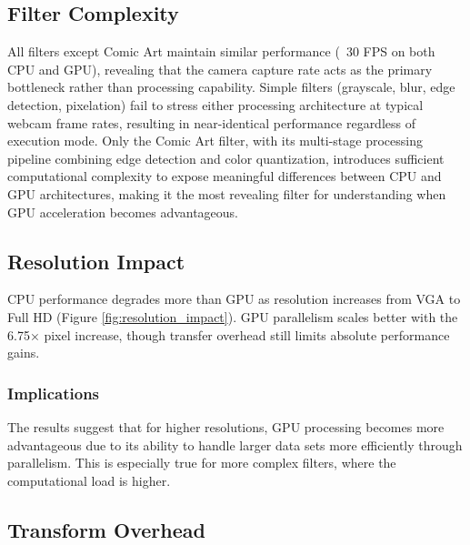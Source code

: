 \documentclass[12pt,a4paper]{article}
\begin{document}
\subsection{Filter Complexity}
All filters except Comic Art maintain similar performance (~30 FPS on both CPU and GPU), revealing that the camera capture rate acts as the primary bottleneck rather than processing capability. Simple filters (grayscale, blur, edge detection, pixelation) fail to stress either processing architecture at typical webcam frame rates, resulting in near-identical performance regardless of execution mode. Only the Comic Art filter, with its multi-stage processing pipeline combining edge detection and color quantization, introduces sufficient computational complexity to expose meaningful differences between CPU and GPU architectures, making it the most revealing filter for understanding when GPU acceleration becomes advantageous.

\subsection{Resolution Impact}
CPU performance degrades more than GPU as resolution increases from VGA to Full HD (Figure \ref{fig:resolution_impact}). GPU parallelism scales better with the 6.75× pixel increase, though transfer overhead still limits absolute performance gains.

\subsubsection{Implications}
The results suggest that for higher resolutions, GPU processing becomes more advantageous due to its ability to handle larger data sets more efficiently through parallelism. This is especially true for more complex filters, where the computational load is higher. 

\subsection{Transform Overhead}
\end{document}
